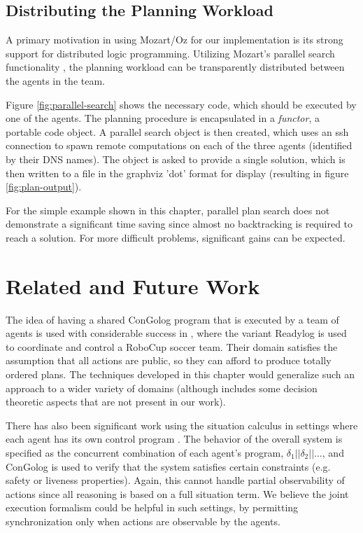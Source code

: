 \subsection{Distributing the Planning Workload}

A primary motivation in using Mozart/Oz for our implementation is
its strong support for distributed logic programming. Utilizing Mozart's
parallel search functionality \citep{Schulte00constraint_services},
the planning workload can be transparently distributed between the
agents in the team.

Figure \ref{fig:parallel-search} shows the necessary code, which
should be executed by one of the agents. The planning procedure is
encapsulated in a \emph{functor}, a portable code object. A parallel
search object is then created, which uses an ssh connection to spawn
remote computations on each of the three agents (identified by their
DNS names). The object is asked to provide a single solution, which
is then written to a file in the graphviz 'dot' format for display
(resulting in figure \ref{fig:plan-output}).

For the simple example shown in this chapter, parallel plan search
does not demonstrate a significant time saving since almost no backtracking
is required to reach a solution. For more difficult problems, significant
gains can be expected.


\section{Related and Future Work}

\label{sec:Related-Work}

The idea of having a shared ConGolog program that is executed by a
team of agents is used with considerable success in \citep{Ferrein2005readylog},
where the variant Readylog is used to coordinate and control a RoboCup
soccer team. Their domain satisfies the assumption that all actions
are public, so they can afford to produce totally ordered plans. The
techniques developed in this chapter would generalize such an approach
to a wider variety of domains (although \citep{Ferrein2005readylog}
includes some decision theoretic aspects that are not present in our
work).

There has also been significant work using the situation calculus
in settings where each agent has its own control program \citep{shapiro02casl}.
The behavior of the overall system is specified as the concurrent
combination of each agent's program, $\delta_{1}||\delta_{2}||\dots$,
and ConGolog is used to verify that the system satisfies certain constraints
(e.g. safety or liveness properties). Again, this cannot handle partial
observability of actions since all reasoning is based on a full situation
term. We believe the joint execution formalism could be helpful in
such settings, by permitting synchronization only when actions are
observable by the agents.

